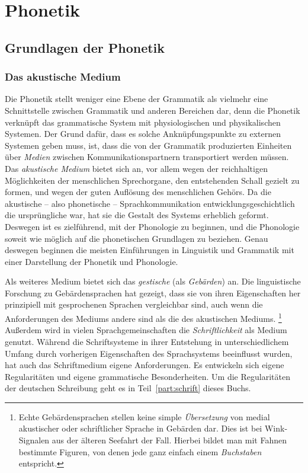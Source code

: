 \chapter{Phonetik}

\label{sec:phonetik}

\section{Grundlagen der Phonetik}

\subsection{Das akustische Medium}

\label{sec:akustischemedium}


Die Phonetik stellt weniger eine Ebene der Grammatik als vielmehr eine Schnittstelle zwischen Grammatik und anderen Bereichen dar, denn die Phonetik verknüpft das grammatische System mit physiologischen und physikalischen Systemen.
Der Grund dafür, dass es solche Anknüpfungspunkte zu externen Systemen geben muss, ist, dass die von der Grammatik produzierten Einheiten über \textit{Medien} zwischen Kommunikationspartnern transportiert werden müssen.
Das \textit{akustische Medium} bietet sich an, vor allem wegen der reichhaltigen Möglichkeiten der menschlichen Sprechorgane, den entstehenden Schall gezielt zu formen, und wegen der guten Auflösung des menschlichen Gehörs.
Da die akustische -- also phonetische -- Sprachkommunikation entwicklungsgeschichtlich die ursprüngliche war, hat sie die Gestalt des Systems erheblich geformt.
Deswegen ist es zielführend, mit der Phonologie zu beginnen, und die Phonologie soweit wie möglich auf die phonetischen Grundlagen zu beziehen.
Genau deswegen beginnen die meisten Einführungen in Linguistik und Grammatik mit einer Darstellung der Phonetik und Phonologie.

Als weiteres Medium bietet sich das \textit{gestische} (als \textit{Gebärden}) an.
Die linguistische Forschung zu Gebärdensprachen hat gezeigt, dass sie von ihren Eigenschaften her prinzipiell mit gesprochenen Sprachen vergleichbar sind, auch wenn die Anforderungen des Mediums andere sind als die des akustischen Mediums.%
\footnote{Echte Gebärdensprachen stellen keine simple \textit{Übersetzung} von medial akustischer oder schriftlicher Sprache in Gebärden dar.
Dies ist \zB bei Wink-Signalen aus der älteren Seefahrt der Fall.
Hierbei bildet man mit Fahnen bestimmte Figuren, von denen jede ganz einfach einem \textit{Buchstaben} entspricht.}
Außerdem wird in vielen Sprachgemeinschaften die \textit{Schriftlichkeit} als Medium genutzt.
Während die Schriftsysteme in ihrer Entstehung in unterschiedlichem Umfang durch vorherigen Eigenschaften des Sprachsystems beeinflusst wurden, hat auch das Schriftmedium eigene Anforderungen.
Es entwickeln sich eigene Regularitäten und eigene grammatische Besonderheiten.
Um die Regularitäten der deutschen Schreibung geht es in Teil~\ref{part:schrift} dieses Buchs.

